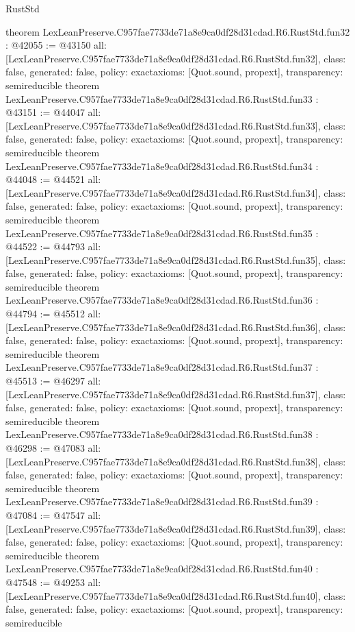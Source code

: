 \begin{lexlean}{RustStd}
\begin{coremodule}
{}
theorem LexLeanPreserve.C957fae7733de71a8e9ca0df28d31cdad.R6.RustStd.fun32 : @42055 := @43150 {
  all: [LexLeanPreserve.C957fae7733de71a8e9ca0df28d31cdad.R6.RustStd.fun32],
  class: false,
  generated: false,
  policy: exact{axioms: [Quot.sound, propext]},
  transparency: semireducible
}
theorem LexLeanPreserve.C957fae7733de71a8e9ca0df28d31cdad.R6.RustStd.fun33 : @43151 := @44047 {
  all: [LexLeanPreserve.C957fae7733de71a8e9ca0df28d31cdad.R6.RustStd.fun33],
  class: false,
  generated: false,
  policy: exact{axioms: [Quot.sound, propext]},
  transparency: semireducible
}
theorem LexLeanPreserve.C957fae7733de71a8e9ca0df28d31cdad.R6.RustStd.fun34 : @44048 := @44521 {
  all: [LexLeanPreserve.C957fae7733de71a8e9ca0df28d31cdad.R6.RustStd.fun34],
  class: false,
  generated: false,
  policy: exact{axioms: [Quot.sound, propext]},
  transparency: semireducible
}
theorem LexLeanPreserve.C957fae7733de71a8e9ca0df28d31cdad.R6.RustStd.fun35 : @44522 := @44793 {
  all: [LexLeanPreserve.C957fae7733de71a8e9ca0df28d31cdad.R6.RustStd.fun35],
  class: false,
  generated: false,
  policy: exact{axioms: [Quot.sound, propext]},
  transparency: semireducible
}
theorem LexLeanPreserve.C957fae7733de71a8e9ca0df28d31cdad.R6.RustStd.fun36 : @44794 := @45512 {
  all: [LexLeanPreserve.C957fae7733de71a8e9ca0df28d31cdad.R6.RustStd.fun36],
  class: false,
  generated: false,
  policy: exact{axioms: [Quot.sound, propext]},
  transparency: semireducible
}
theorem LexLeanPreserve.C957fae7733de71a8e9ca0df28d31cdad.R6.RustStd.fun37 : @45513 := @46297 {
  all: [LexLeanPreserve.C957fae7733de71a8e9ca0df28d31cdad.R6.RustStd.fun37],
  class: false,
  generated: false,
  policy: exact{axioms: [Quot.sound, propext]},
  transparency: semireducible
}
theorem LexLeanPreserve.C957fae7733de71a8e9ca0df28d31cdad.R6.RustStd.fun38 : @46298 := @47083 {
  all: [LexLeanPreserve.C957fae7733de71a8e9ca0df28d31cdad.R6.RustStd.fun38],
  class: false,
  generated: false,
  policy: exact{axioms: [Quot.sound, propext]},
  transparency: semireducible
}
theorem LexLeanPreserve.C957fae7733de71a8e9ca0df28d31cdad.R6.RustStd.fun39 : @47084 := @47547 {
  all: [LexLeanPreserve.C957fae7733de71a8e9ca0df28d31cdad.R6.RustStd.fun39],
  class: false,
  generated: false,
  policy: exact{axioms: [Quot.sound, propext]},
  transparency: semireducible
}
theorem LexLeanPreserve.C957fae7733de71a8e9ca0df28d31cdad.R6.RustStd.fun40 : @47548 := @49253 {
  all: [LexLeanPreserve.C957fae7733de71a8e9ca0df28d31cdad.R6.RustStd.fun40],
  class: false,
  generated: false,
  policy: exact{axioms: [Quot.sound, propext]},
  transparency: semireducible
}
\end{coremodule}
\end{lexlean}
